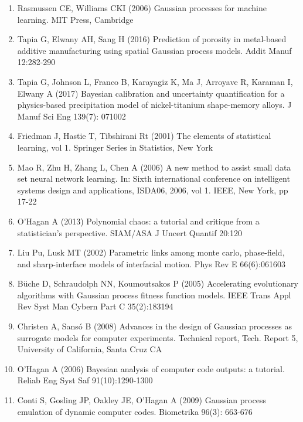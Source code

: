 \documentclass[10pt]{article}
\begin{document}
\begin{enumerate}
  \item Rasmussen CE, Williams CKI (2006) Gaussian processes for machine learning. MIT Press, Cambridge

  \item Tapia G, Elwany AH, Sang H (2016) Prediction of porosity in metal-based additive manufacturing using spatial Gaussian process models. Addit Manuf 12:282-290

  \item Tapia G, Johnson L, Franco B, Karayagiz K, Ma J, Arroyave R, Karaman I, Elwany A (2017) Bayesian calibration and uncertainty quantification for a physics-based precipitation model of nickel-titanium shape-memory alloys. J Manuf Sci Eng 139(7): 071002

  \item Friedman J, Hastie T, Tibshirani Rt (2001) The elements of statistical learning, vol 1. Springer Series in Statistics, New York

  \item Mao R, Zhu H, Zhang L, Chen A (2006) A new method to assist small data set neural network learning. In: Sixth international conference on intelligent systems design and applications, ISDA06, 2006, vol 1. IEEE, New York, pp 17-22

  \item O'Hagan A (2013) Polynomial chaos: a tutorial and critique from a statistician's perspective. SIAM/ASA J Uncert Quantif 20:120

  \item Liu Pu, Lusk MT (2002) Parametric links among monte carlo, phase-field, and sharp-interface models of interfacial motion. Phys Rev E 66(6):061603

  \item Büche D, Schraudolph NN, Koumoutsakos P (2005) Accelerating evolutionary algorithms with Gaussian process fitness function models. IEEE Trans Appl Rev Syst Man Cybern Part C 35(2):183194

  \item Christen A, Sansó B (2008) Advances in the design of Gaussian processes as surrogate models for computer experiments. Technical report, Tech. Report 5, University of California, Santa Cruz CA

  \item O'Hagan A (2006) Bayesian analysis of computer code outputs: a tutorial. Reliab Eng Syst Saf 91(10):1290-1300

  \item Conti S, Gosling JP, Oakley JE, O'Hagan A (2009) Gaussian process emulation of dynamic computer codes. Biometrika 96(3): 663-676


\end{enumerate}
\end{document}
